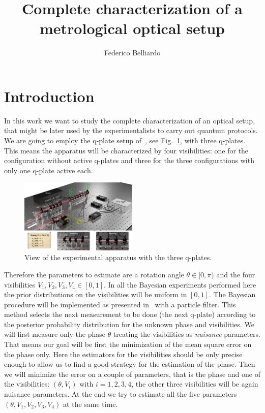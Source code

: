 \documentclass[aps, pra, 10pt, twocolumn, superscriptaddress,floatfix]{revtex4-1}
\begin{document}
%
\title{Complete characterization of a metrological optical setup} 
%
\author{Federico Belliardo}

\maketitle


\section{Introduction}
%
In this work we want to study the complete characterization of an optical setup, that might be later used by the experimentalists to carry out quantum protocols. We are going to employ the q-plate setup of~\cite{Cimini2021}, see Fig.~\ref{fig:apparatus}, with three q-plates. This means the apparatus will be characterized by four visibilities: one for the configuration without active q-plates and three for the three configurations with only one q-plate active each. 
%
\begin{figure}[!th]
	\begin{center}
		\includegraphics[width=0.5\textwidth]{FigureSetup.pdf}
	\end{center}
	\caption{View of the experimental apparatus with the three q-plates.}
	\label{fig:apparatus}
\end{figure}
%
Therefore the parameters to estimate are a rotation angle $\theta \in [0, \pi)$ and the four visibilities $V_1, V_2, V_3, V_4 \in [0, 1]$. In all the Bayesian experiments performed here the prior distributions on the visibilities will be uniform in $[0, 1]$. The Bayesian procedure will be implemented as presented in~\cite{Granade2012} with a particle filter. This method selects the next measurement to be done (the next q-plate) according to the posterior probability distribution for the unknown phase and visibilities. We will first measure only the phase $\theta$ treating the visibilities as \textit{nuisance} parameters. That means our goal will be first the minimization of the mean square error on the phase only. Here the estimators for the visibilities should be only precise enough to allow us to find a good strategy for the estimation of the phase. Then we will minimize the error on a couple of parameters, that is the phase and one of the visibilities: $(\theta, V_i)$ with $i=1, 2, 3, 4$, the other three visibilities will be again nuisance parameters. At the end we try to estimate all the five parameters $(\theta, V_1, V_2, V_3, V_4)$ at the same time. 
\end{document}
